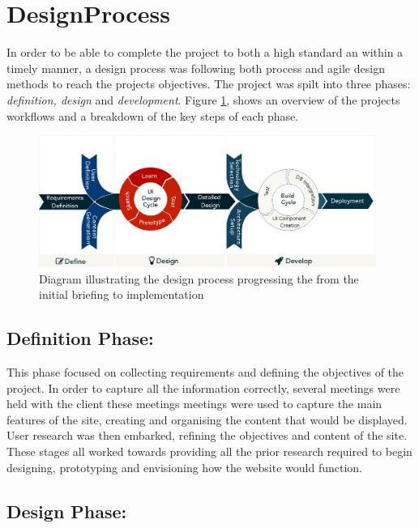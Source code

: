 \documentclass[fontsize=10pt]{extarticle}
\numberwithin{figure}{section} %
\begin{document}
\newpage

\hypertarget{designprocess}{%
\section{DesignProcess}\label{designprocess}}

In order to be able to complete the project to both a high standard an
within a timely manner, a design process was following both process and
agile design methods to reach the projects objectives. The project was
spilt into three phases: \emph{definition, design} and
\emph{development}. Figure \ref{designprocess}, shows an overview of the
projects workflows and a breakdown of the key steps of each phase.

\begin{figure}[H]
\centering
\includegraphics[trim = 0 0 0 0, clip, width=0.98\textwidth]{DesignProcess.eps}
\caption{Diagram illustrating the design process progressing the from the initial briefing to implementation}
\label{designprocess}
\end{figure}

\hypertarget{definition-phase}{%
\subsection{Definition Phase:}\label{definition-phase}}

This phase focused on collecting requirements and defining the
objectives of the project. In order to capture all the information
correctly, several meetings were held with the client these meetings
meetings were used to capture the main features of the site, creating
and organising the content that would be displayed. User research was
then embarked, refining the objectives and content of the site. These
stages all worked towards providing all the prior research required to
begin designing, prototyping and envisioning how the website would
function.

\hypertarget{design-phase}{%
\subsection{Design Phase:}\label{design-phase}}
\end{document}
